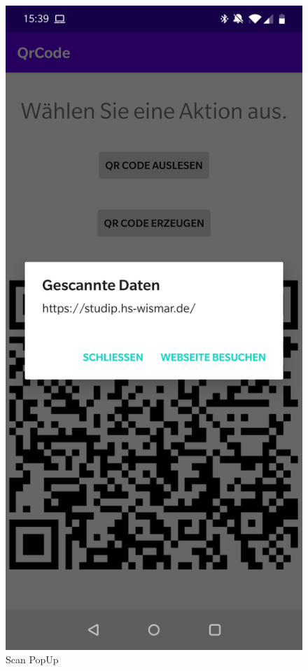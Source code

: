 \documentclass[12pt,					%
							 oneside,			%
							 a4paper,			%
							 halfparskip,		%
							 liststotoc,			%
							 bibtotoc,			%
							 fleqn,				%
							 pointlessnumbers]	%
							 {scrreprt}
\begin{document}
\begin{figure}[ht]
   \begin{minipage}[b]{.4\linewidth} %
	\centering
	\includegraphics[scale=0.1]{pictures/popup} 
	\caption{Scan PopUp}
   \end{minipage}
\end{figure}
\newpage
\end{document}
